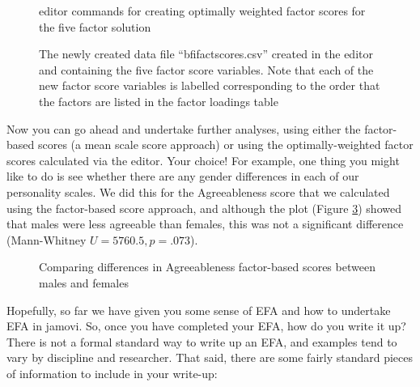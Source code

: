 \begin{figure}[!htp]
\begin{center}
\caption{ editor commands for creating optimally weighted factor scores for the five factor solution}
\label{fig:fa10}
\HR
\end{center}
\end{figure}

\begin{figure}[!htp]
\begin{center}
\caption{The newly created data file “bfifactscores.csv” created in the  editor and containing the five factor score variables. Note that each of the new factor score variables is labelled corresponding to the order that the factors are listed in the factor loadings table}
\label{fig:fa11}
\HR
\end{center}
\end{figure}

Now you can go ahead and undertake further analyses, using either the factor-based scores (a mean scale score approach) or using the optimally-weighted factor scores calculated via the  editor. Your choice! For example, one thing you might like to do is see whether there are any gender differences in each of our personality scales. We did this for the Agreeableness score that we calculated using the factor-based score approach, and although the plot (Figure \ref{fig:fa12}) showed that males were less agreeable than females, this was not a significant difference (Mann-Whitney $U=5760.5, p=.073$).

\begin{figure}[!htb]
\begin{center}
\caption{Comparing differences in Agreeableness factor-based scores between males and females}
\label{fig:fa12}
\HR
\end{center}
\end{figure}



Hopefully, so far we have given you some sense of EFA and how to undertake EFA in jamovi. So, once you have completed your EFA, how do you write it up? There is not a formal standard way to write up an EFA, and examples tend to vary by discipline and researcher. That said, there are some fairly standard pieces of information to include in your write-up: 

